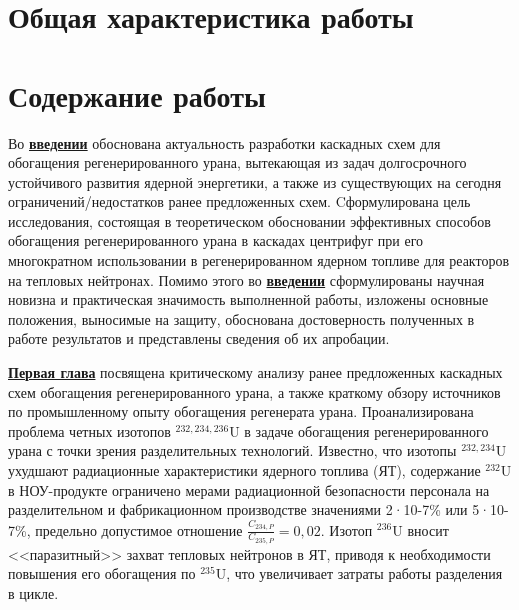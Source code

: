 \section*{Общая характеристика работы}

\newcommand{\actuality}{\underline{\textbf{\actualityTXT}}}
\newcommand{\progress}{\underline{\textbf{\progressTXT}}}
\newcommand{\aim}{\underline{{\textbf\aimTXT}}}
\newcommand{\tasks}{\underline{\textbf{\tasksTXT}}}
\newcommand{\novelty}{\underline{\textbf{\noveltyTXT}}}
\newcommand{\influence}{\underline{\textbf{\influenceTXT}}}
\newcommand{\methods}{\underline{\textbf{\methodsTXT}}}
\newcommand{\defpositions}{\underline{\textbf{\defpositionsTXT}}}
\newcommand{\reliability}{\underline{\textbf{\reliabilityTXT}}}
\newcommand{\probation}{\underline{\textbf{\probationTXT}}}
\newcommand{\contribution}{\underline{\textbf{\contributionTXT}}}
\newcommand{\publications}{\underline{\textbf{\publicationsTXT}}}



\section*{Содержание работы}
Во \underline{\textbf{введении}} обоснована актуальность разработки каскадных схем для обогащения регенерированного урана, вытекающая из задач долгосрочного устойчивого развития ядерной энергетики, а также из существующих на сегодня ограничений/недостатков ранее предложенных схем. Cформулирована цель исследования, состоящая в теоретическом обосновании эффективных способов обогащения регенерированного урана в каскадах центрифуг при его многократном использовании в регенерированном ядерном топливе для реакторов на тепловых нейтронах. Помимо этого во \underline{\textbf{введении}} сформулированы научная новизна и практическая значимость выполненной работы, изложены основные положения, выносимые на защиту, обоснована достоверность полученных в работе результатов и представлены сведения об их апробации.

\underline{\textbf{Первая глава}} посвящена критическому анализу ранее предложенных каскадных схем обогащения регенерированного урана, а также краткому обзору источников по промышленному опыту обогащения регенерата урана. Проанализирована проблема четных изотопов $^{232,234,236}$U в задаче обогащения регенерированного урана с точки зрения разделительных технологий. Известно, что изотопы $^{232,234}$U ухудшают радиационные характеристики ядерного топлива (ЯТ), содержание $^{232}$U в НОУ-продукте ограничено мерами радиационной безопасности персонала на разделительном и фабрикационном производстве значениями 2·10-7\% или 5·10-7\%, предельно допустимое отношение $\frac{C_{234,{P}}}{C_{235,{P}}} = 0,02$. Изотоп $^{236}$U вносит <<паразитный>> захват тепловых нейтронов в ЯТ, приводя к необходимости повышения его обогащения по $^{235}$U, что увеличивает затраты работы разделения в цикле. 

